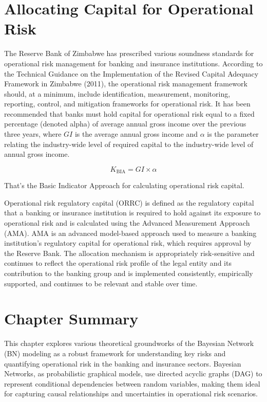 \section{Allocating Capital for Operational Risk }
The Reserve Bank of Zimbabwe has prescribed various soundness standards for operational risk management for banking and insurance institutions. According to the Technical Guidance on the Implementation of the Revised Capital Adequacy Framework in Zimbabwe (2011), the operational risk management framework should, at a minimum, include identification, measurement, monitoring, reporting, control, and mitigation frameworks for operational risk. It has been recommended that banks must hold capital for operational risk equal to a fixed percentage (denoted alpha) of average annual gross income over the previous three years, where \( GI \) is the average annual gross income and \( \alpha \) is the parameter relating the industry-wide level of required capital to the industry-wide level of annual gross income. 

\[
K_{\text{BIA}} = GI \times \alpha
\]

That’s the Basic Indicator Approach for calculating operational risk capital.


Operational risk regulatory capital (ORRC) is defined as the regulatory capital that a banking or insurance institution is required to hold against its exposure to operational risk and is calculated using the Advanced Measurement Approach (AMA). AMA is an advanced model-based approach used to measure a banking institution’s regulatory capital for operational risk, which requires approval by the Reserve Bank. The allocation mechanism is appropriately risk-sensitive and continues to reflect the operational risk profile of the legal entity and its contribution to the banking group and is implemented consistently, empirically supported, and continues to be relevant and stable over time.

\newpage
\section{Chapter Summary}
This chapter explores various theoretical groundworks of the Bayesian Network (BN) modeling as a robust framework for understanding key risks and quantifying operational risk in the banking and insurance sectors. Bayesian Networks, as probabilistic graphical models, use directed acyclic graphs (DAG) to represent conditional dependencies between random variables, making them ideal for capturing causal relationships and uncertainties in operational risk scenarios. 


